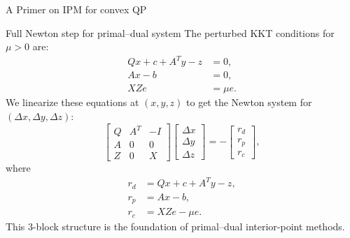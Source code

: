 \begin{frame}{A Primer on IPM for convex QP}
\end{frame}


\begin{frame}{Full Newton step for primal--dual system}
The perturbed KKT conditions for $\mu>0$ are:
\begin{align*}
  Qx + c + A^T y - z &= 0, \\
  Ax - b &= 0, \\
  XZe &= \mu e.
\end{align*}
We linearize these equations at $(x,y,z)$ to get the Newton system for $(\Delta x, \Delta y, \Delta z)$:
\[
  \begin{bmatrix}
    Q & A^T & -I \\
    A & 0   & 0   \\
    Z & 0   & X
  \end{bmatrix}
  \begin{bmatrix}
    \Delta x \\
    \Delta y \\
    \Delta z
  \end{bmatrix}
  = -\begin{bmatrix}
    r_d \\
    r_p \\
    r_c
  \end{bmatrix},
\]
where
\begin{align*}
  r_d &= Qx + c + A^T y - z,\\
  r_p &= Ax - b,\\
  r_c &= XZe - \mu e.
\end{align*}
This 3-block structure is the foundation of primal--dual interior-point methods.
\end{frame}


